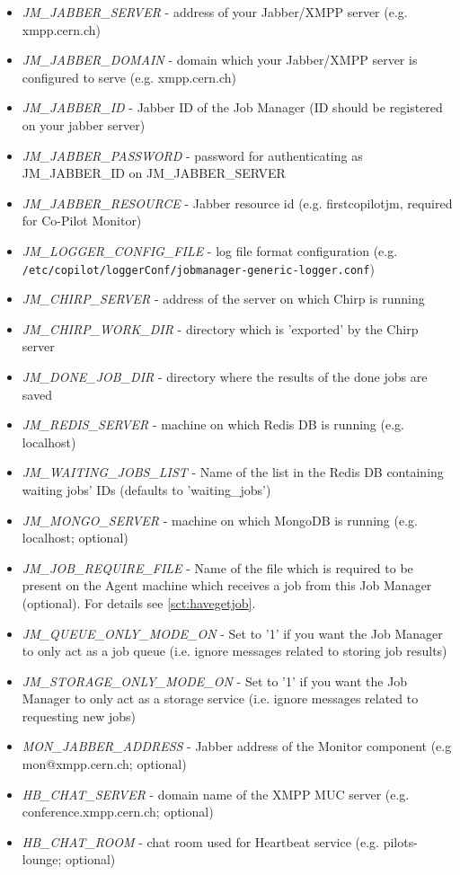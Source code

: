 \begin{itemize}
  \item \emph{JM\_JABBER\_SERVER} - address of your Jabber/XMPP server (e.g. xmpp.cern.ch)
  \item \emph{JM\_JABBER\_DOMAIN} - domain which your Jabber/XMPP server is configured to serve (e.g. xmpp.cern.ch)
  \item \emph{JM\_JABBER\_ID} - Jabber ID of the Job Manager (ID should be registered on your jabber server)
  \item \emph{JM\_JABBER\_PASSWORD} - password for authenticating as JM\_JABBER\_ID on JM\_JABBER\_SERVER
  \item \emph{JM\_JABBER\_RESOURCE} - Jabber resource id (e.g. firstcopilotjm, required for Co-Pilot Monitor)
  \item \emph{JM\_LOGGER\_CONFIG\_FILE} - log file format configuration (e.g. \texttt{/etc/copilot/loggerConf/jobmanager-generic-logger.conf})
  \item \emph{JM\_CHIRP\_SERVER} - address of the server on which Chirp is running
  \item \emph{JM\_CHIRP\_WORK\_DIR} - directory which is 'exported' by the Chirp server
  \item \emph{JM\_DONE\_JOB\_DIR} - directory where the results of the done jobs are saved
  \item \emph{JM\_REDIS\_SERVER} - machine on which Redis DB is running (e.g. localhost)
  \item \emph{JM\_WAITING\_JOBS\_LIST} - Name of the list in the Redis DB containing waiting jobs' IDs (defaults to 'waiting\_jobs')
  \item \emph{JM\_MONGO\_SERVER} - machine on which MongoDB is running (e.g. localhost; optional)
  \item \emph{JM\_JOB\_REQUIRE\_FILE} - Name of the file which is required to be present on the Agent machine which receives a job from this Job Manager (optional). For details see \ref{sct:havegetjob}.
  \item \emph{JM\_QUEUE\_ONLY\_MODE\_ON} - Set to '1' if you want the Job Manager to only act as a job queue (i.e. ignore messages related to storing job results)
  \item \emph{JM\_STORAGE\_ONLY\_MODE\_ON} - Set to '1' if you want the Job Manager to only act as a storage service (i.e. ignore messages related to requesting new jobs)
  \item \emph{MON\_JABBER\_ADDRESS} - Jabber address of the Monitor component (e.g mon@xmpp.cern.ch; optional)
  \item \emph{HB\_CHAT\_SERVER} - domain name of the XMPP MUC server (e.g. conference.xmpp.cern.ch; optional)
  \item \emph{HB\_CHAT\_ROOM} - chat room used for Heartbeat service (e.g. pilots-lounge; optional)
 \end{itemize}

